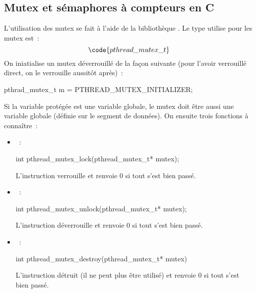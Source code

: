 \begin{adjustwidth}{-3cm}{-3cm}
\subsection{Mutex et sémaphores à compteurs en C}

L'utilisation des mutex se fait à l'aide de la bibliothèque . Le type utilise pour les mutex est~:
$$\code{pthread\_mutex\_t}$$
On iniatialise un mutex déverrouillé de la façon suivante (pour l'avoir verrouillé direct, on le verrouille aussitôt après)~:
\begin{lstC}
    pthrad_mutex_t m = PTHREAD_MUTEX_INITIALIZER;
\end{lstC}
Si la variable protégée est une variable globale, le mutex doit être aussi une variable globale (définie sur le segment de données).
On ensuite trois fonctions à connaître~:
\begin{itemize}
    \item {}~:
    \begin{lstC}
        int pthread_mutex_lock(pthread_mutex_t* mutex);
    \end{lstC}
    L'instruction  verrouille  et renvoie 0 si tout s'est bien passé.
    \item {}~:
    \begin{lstC}
        int pthread_mutex_unlock(pthread_mutex_t* mutex);
    \end{lstC}
    L'instruction  déverrouille  et renvoie 0 si tout s'est bien passé.
    \item {}~:
    \begin{lstC}
        int pthread_mutex_destroy(pthread_mutex_t* mutex)
    \end{lstC}
    L'instruction  détruit  (il ne peut plus être utilisé) et renvoie 0 si tout s'est bien passé.
\end{itemize}


\end{adjustwidth}
